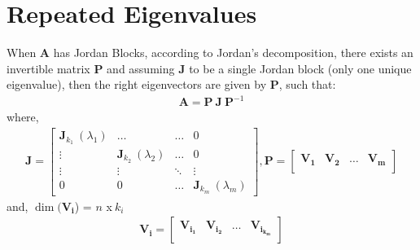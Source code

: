 \documentclass{scrreprt}
\begin{document}
\section{Repeated Eigenvalues}
When $\bm{A}$ has Jordan Blocks, according to Jordan's decomposition, there exists an invertible matrix $\bm{P}$ and assuming $\bm{J}$ to be a single Jordan block (only one unique eigenvalue), then the right eigenvectors are given by $\bm{P}$, such that:
\begin{align*}
\bm{A} = \bm{P}\: \bm{J}\: \bm{P}^{-1}
\end{align*}
where,
\begin{align*}
\bm{J}=
\begin{bmatrix}
\bm{J}_{k_1}\:(\lambda_1) & \dots & \dots & 0 \\
\vdots & \bm{J}_{k_2}\:(\lambda_2) & \dots & 0 \\
\vdots & \vdots & \ddots & \vdots \\
0 & 0 & \dots & \bm{J}_{k_m}\:(\lambda_m) 
\end{bmatrix},
\bm{P}=
\begin{bmatrix}
\bm{V_1} & \bm{V_2} & \dots & \bm{V_m} \\ 
\end{bmatrix}
\end{align*}
and, $\dim(\bm{V_i}$) = $n$ x$\: k_i$
\begin{align*}
\bm{V_i}=
\begin{bmatrix}
\bm{V_{i_1}} & \bm{V_{i_2}} & \dots & \bm{V_{i_{k_m}}} \\
\end{bmatrix}
\end{align*}
\end{document}
